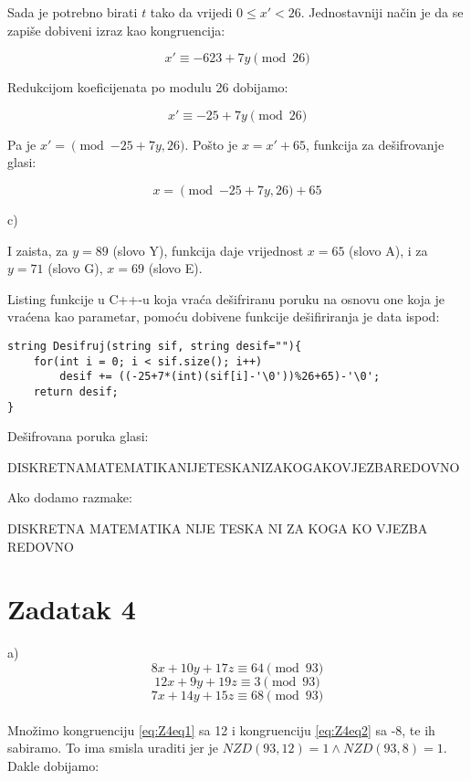 \documentclass[12pt]{article}
\begin{document}
Sada je potrebno birati $t$ tako da vrijedi $0 \leq x' < 26$. Jednostavniji način je da se zapiše dobiveni izraz kao kongruencija:

$$x' \equiv -623 + 7y \pmod{26}$$\vspace{1mm}

Redukcijom koeficijenata po modulu 26 dobijamo:

$$x' \equiv -25 + 7y \pmod{26}$$\vspace{1mm}

Pa je $x' = \pmod{-25 + 7y, 26}$. Pošto je $x = x' + 65$, funkcija za dešifrovanje glasi:

$$x = \pmod{-25 + 7y, 26} + 65$$

c)

I zaista, za $y = 89$ (slovo Y), funkcija daje vrijednost $x = 65$ (slovo A), i za $y = 71$ (slovo G), $x = 69$ (slovo E).

Listing funkcije u C++-u koja vraća dešifriranu poruku na osnovu one koja je vraćena kao parametar, pomoću dobivene funkcije dešifiriranja je data ispod:\vspace{5mm}
\begin{lstlisting}
string Desifruj(string sif, string desif=""){
    for(int i = 0; i < sif.size(); i++)
        desif += ((-25+7*(int)(sif[i]-'\0'))%26+65)-'\0';
    return desif;
}
\end{lstlisting}

Dešifrovana poruka glasi:
\begin{center}
DISKRETNAMATEMATIKANIJETESKANIZAKOGAKOVJEZBAREDOVNO
\end{center}

Ako dodamo razmake:

\begin{center}
DISKRETNA MATEMATIKA NIJE TESKA NI ZA KOGA KO VJEZBA REDOVNO
\end{center}

\newpage

\section*{Zadatak 4\label{Z4}}

a)
\[
8x + 10y + 17z \equiv 64 \pmod{93} \label{eq:Z4eq1} \tag{1}
\]
\[
12x + 9y + 19z \equiv 3 \pmod{93} \label{eq:Z4eq2} \tag{2}
\]
\[
7x + 14y + 15z \equiv 68 \pmod{93} \label{eq:Z4eq3} \tag{3}
\]
\\
Množimo kongruenciju \ref{eq:Z4eq1} sa 12 i kongruenciju \ref{eq:Z4eq2} sa -8, te ih sabiramo. To ima smisla uraditi jer je $NZD(93, 12) = 1 \land NZD(93, 8) = 1$. Dakle dobijamo:
\end{document}
